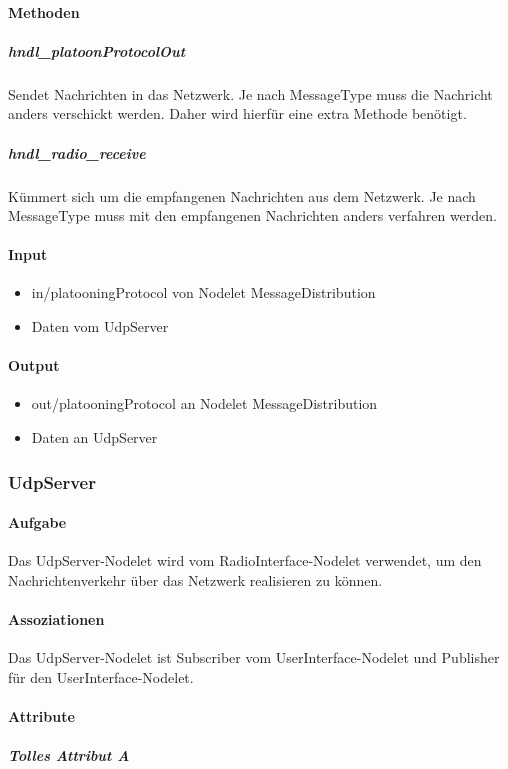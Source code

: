 \documentclass[a4paper, 12pt, titlepage]{scrartcl}
\begin{document}
				\paragraph{Methoden}
				    \subparagraph{hndl\_platoonProtocolOut} Sendet Nachrichten in das Netzwerk. Je nach MessageType muss die Nachricht anders verschickt werden. Daher wird hierfür eine extra Methode benötigt.
					\subparagraph{hndl\_radio\_receive} Kümmert sich um die empfangenen Nachrichten aus dem Netzwerk. Je nach MessageType muss mit den empfangenen Nachrichten anders verfahren werden.
				\paragraph{Input}
				    \begin{itemize}
				        \item in/platooningProtocol von Nodelet MessageDistribution
				        \item Daten vom UdpServer
				    \end{itemize}
				\paragraph{Output}
				    \begin{itemize}
				        \item out/platooningProtocol an Nodelet MessageDistribution
				        \item Daten an UdpServer
				    \end{itemize}

		    \subsubsection{UdpServer}
			\label{udpserver}
				\paragraph{Aufgabe} Das UdpServer-Nodelet wird vom RadioInterface-Nodelet verwendet, um den Nachrichtenverkehr über das Netzwerk realisieren zu können.
				\paragraph{Assoziationen} Das UdpServer-Nodelet ist Subscriber vom UserInterface-Nodelet und Publisher für den UserInterface-Nodelet.
				\paragraph{Attribute}
					\subparagraph{Tolles Attribut A}
\end{document}
